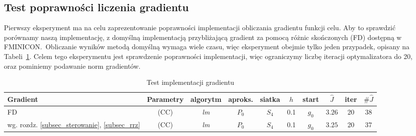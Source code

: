 \documentclass[licencjacka]{pracamgr}
\begin{document}
\subsection{Test poprawności liczenia gradientu}
Pierwszy eksperyment ma na celu zaprezentowanie poprawności implementacji obliczania gradientu funkcji celu. Aby to sprawdzić porównamy naszą implementację, z domyślną implementacją przybliżającą gradient za pomocą różnic skończonych (FD) dostępną w FMINICON.\ Obliczanie wyników metodą domyślną wymaga wiele czasu, więc eksperyment obejmie tylko jeden przypadek, opisany na Tabeli~\ref{test_tbl}. Celem tego eksperymentu jest sprawdzenie poprawności implementacji, więc ograniczymy liczbę iteracji optymalizatora do 20, oraz pominiemy podawanie norm gradientów.
\begin{table}[h]
  \begin{center}
    \begin{tabular}{|p{1.7cm}|c|c|c|c|c|c|c|c|c|}
      \hline
      Gradient & Parametry & algorytm & aproks. & siatka & $h$ & start & $\hat{J}$ & iter & $\#\hat{J}$ \\
      \hline
      FD & (CC) & {\it lm\/} & $P_0$ & $S_4$ & 0.1 & $g_0$ & $3.26$ & 20 & 38 \\
      \hline
      wg. rozdz. \ref{subsec_sterowanie}, \ref{subsec_rrz} & (CC) & {\it lm\/} & $P_0$ & $S_4$ & 0.1 & $g_0$ & $3.25$ & 20 & 37 \\
      \hline
    \end{tabular}
    \caption{Test implementacji gradientu}\label{test_tbl}
  \end{center}
\end{table}
\end{document}
